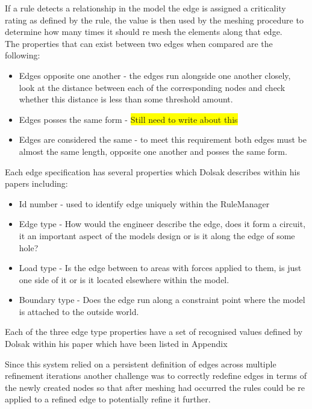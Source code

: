 \noindent
If a rule detects a relationship in the model the edge is assigned a criticality rating as defined by the rule, the value is then used by the meshing procedure to determine how many times it should re mesh the elements along that edge. \\ 
 
\noindent
The properties that can exist between two edges when compared are the following:
\begin{itemize}
\item Edges opposite one another - the edges run alongside one another closely, look at the distance between each of the corresponding nodes and check whether this distance is less than some threshold amount.

\item Edges posses the same form - \colorbox{yellow}{Still need to write about this}

\item Edges are considered the same - to meet this requirement both edges must be almost the same length, opposite one another and posses the same form.
\end{itemize}

\noindent
Each edge specification has several properties which Dolsak describes within his papers including:
\begin{itemize}
\item Id number - used to identify edge uniquely within the RuleManager 
\item Edge type - How would the engineer describe the edge, does it form a circuit, it an important aspect of the models design or is it along the edge of some hole?
\item Load type - Is the edge between to areas with forces applied to them, is just one side of it or is it located elsewhere within the model.
\item Boundary type - Does the edge run along a constraint point where the model is attached to the outside world.


\end{itemize}

Each of the three edge type properties have a set of recognised values defined by Dolsak within his paper which have been listed in Appendix 


\noindent
Since this system relied on a persistent definition of edges across multiple refinement iterations another challenge was to correctly redefine edges in terms of the newly created nodes so that after meshing had occurred the rules could be re applied to a refined edge to potentially refine it further.

